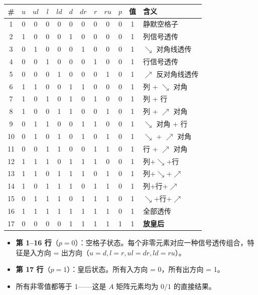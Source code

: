 \documentclass[12pt,a4paper]{article}
\begin{document}
{\small
\begin{center}
\renewcommand{\arraystretch}{1.2}
\begin{tabular}{c|cccccccc|c|c|l}
\toprule
\# & $u$ & $ul$ & $l$ & $ld$ & $d$ & $dr$ & $r$ & $ru$ & $p$ & 值 & 含义 \\
\midrule
1  & 0 & 0 & 0 & 0 & 0 & 0 & 0 & 0 & 0 & 1 & 静默空格子 \\
2  & 1 & 0 & 0 & 0 & 1 & 0 & 0 & 0 & 0 & 1 & 列信号透传 \\
3  & 0 & 1 & 0 & 0 & 0 & 1 & 0 & 0 & 0 & 1 & $\searrow$ 对角线透传 \\
4  & 0 & 0 & 1 & 0 & 0 & 0 & 1 & 0 & 0 & 1 & 行信号透传 \\
5  & 0 & 0 & 0 & 1 & 0 & 0 & 0 & 1 & 0 & 1 & $\nearrow$ 反对角线透传 \\
\midrule
6  & 1 & 1 & 0 & 0 & 1 & 1 & 0 & 0 & 0 & 1 & 列 + $\searrow$ 对角 \\
7  & 1 & 0 & 1 & 0 & 1 & 0 & 1 & 0 & 0 & 1 & 列 + 行 \\
8  & 1 & 0 & 0 & 1 & 1 & 0 & 0 & 1 & 0 & 1 & 列 + $\nearrow$ 对角 \\
9  & 0 & 1 & 1 & 0 & 0 & 1 & 1 & 0 & 0 & 1 & $\searrow$ 对角 + 行 \\
10 & 0 & 1 & 0 & 1 & 0 & 1 & 0 & 1 & 0 & 1 & $\searrow$ + $\nearrow$ 对角 \\
11 & 0 & 0 & 1 & 1 & 0 & 0 & 1 & 1 & 0 & 1 & 行 + $\nearrow$ 对角 \\
\midrule
12 & 1 & 1 & 1 & 0 & 1 & 1 & 1 & 0 & 0 & 1 & 列+$\searrow$+行 \\
13 & 1 & 1 & 0 & 1 & 1 & 1 & 0 & 1 & 0 & 1 & 列+$\searrow$+$\nearrow$ \\
14 & 1 & 0 & 1 & 1 & 1 & 0 & 1 & 1 & 0 & 1 & 列+行+$\nearrow$ \\
15 & 0 & 1 & 1 & 1 & 0 & 1 & 1 & 1 & 0 & 1 & $\searrow$+行+$\nearrow$ \\
\midrule
16 & 1 & 1 & 1 & 1 & 1 & 1 & 1 & 1 & 0 & 1 & 全部透传 \\
\midrule
17 & 0 & 0 & 0 & 0 & 1 & 1 & 1 & 1 & 1 & 1 & \textbf{放皇后} \\
\bottomrule
\end{tabular}
\end{center}
}

\begin{sumbox}[对应规律]
\begin{itemize}
  \item \textbf{第 1--16 行}（$p = 0$）：空格子状态。每个非零元素对应一种信号透传组合，特征是入方向 = 出方向（$u = d, l = r, ul = dr, ld = ru$）。
  \item \textbf{第 17 行}（$p = 1$）：皇后状态。所有入方向 = 0，所有出方向 = 1。
  \item 所有非零值都等于 $1$——这是 $A$ 矩阵元素均为 $0/1$ 的直接结果。
\end{itemize}
\end{sumbox}
\end{document}
